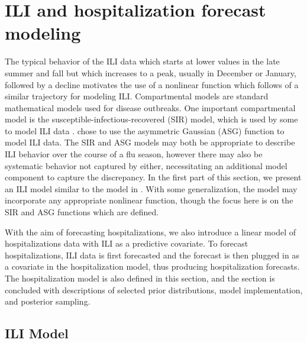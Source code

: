 \documentclass[ba]{imsart}
\theoremstyle{plain}
\theoremstyle{definition}
\theoremstyle{remark}
\begin{document}
\section{ILI and hospitalization forecast modeling} \label{sec:functions}


The typical behavior of the ILI data which starts at lower values in the late summer and fall but which increases to a peak, usually in December or January, followed by a decline motivates the use of a nonlinear function which follows of a similar trajectory for modeling ILI. Compartmental models are standard mathematical models used for disease outbreaks. One important compartmental model is the susceptible-infectious-recovered (SIR) model, which is used by some to model ILI data \cite[]{osthus2019dynamic, allen2017primer}. \cite{ulloa2019} chose to use the asymmetric Gaussian (ASG) function to model ILI data. The SIR and ASG models may both be appropriate to describe ILI behavior over the course of a flu season, however there may also be systematic behavior not captured by either, necessitating an additional model component to capture the discrepancy. In the first part of this section, we present an ILI model similar to the model in \cite{osthus2019dynamic}. With some generalization, the model may incorporate any appropriate nonlinear function, though the focus here is on the SIR and ASG functions which are defined. 

With the aim of forecasting hospitalizations, we also introduce a linear model of hospitalizations data with ILI as a predictive covariate. To forecast hospitalizations, ILI data is first forecasted and the forecast is then plugged in as a covariate in the hospitalization model, thus producing hospitalization forecasts. The hospitalization model is also defined in this section, and the section is concluded with descriptions of selected prior distributions, model implementation, and posterior sampling.



\subsection{ILI Model} \label{sec:ili_model}
\end{document}
